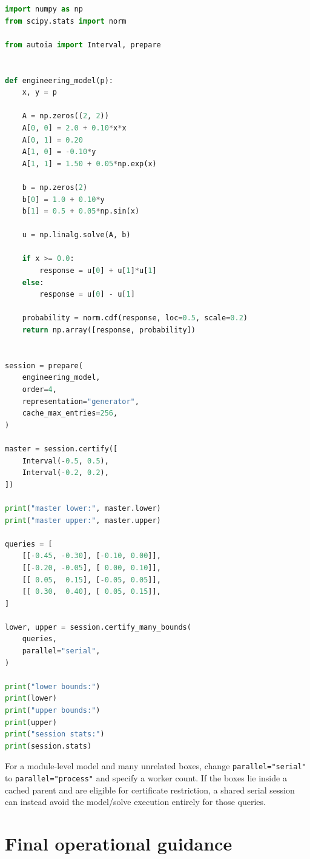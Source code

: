 \documentclass[11pt]{article}
\begin{document}
\begin{lstlisting}[language=Python]
import numpy as np
from scipy.stats import norm

from autoia import Interval, prepare


def engineering_model(p):
    x, y = p

    A = np.zeros((2, 2))
    A[0, 0] = 2.0 + 0.10*x*x
    A[0, 1] = 0.20
    A[1, 0] = -0.10*y
    A[1, 1] = 1.50 + 0.05*np.exp(x)

    b = np.zeros(2)
    b[0] = 1.0 + 0.10*y
    b[1] = 0.5 + 0.05*np.sin(x)

    u = np.linalg.solve(A, b)

    if x >= 0.0:
        response = u[0] + u[1]*u[1]
    else:
        response = u[0] - u[1]

    probability = norm.cdf(response, loc=0.5, scale=0.2)
    return np.array([response, probability])


session = prepare(
    engineering_model,
    order=4,
    representation="generator",
    cache_max_entries=256,
)

master = session.certify([
    Interval(-0.5, 0.5),
    Interval(-0.2, 0.2),
])

print("master lower:", master.lower)
print("master upper:", master.upper)

queries = [
    [[-0.45, -0.30], [-0.10, 0.00]],
    [[-0.20, -0.05], [ 0.00, 0.10]],
    [[ 0.05,  0.15], [-0.05, 0.05]],
    [[ 0.30,  0.40], [ 0.05, 0.15]],
]

lower, upper = session.certify_many_bounds(
    queries,
    parallel="serial",
)

print("lower bounds:")
print(lower)
print("upper bounds:")
print(upper)
print("session stats:")
print(session.stats)
\end{lstlisting}

For a module-level model and many unrelated boxes, change
\texttt{parallel="serial"} to \texttt{parallel="process"} and specify a worker
count.  If the boxes lie inside a cached parent and are eligible for certificate
restriction, a shared serial session can instead avoid the model/solve execution
entirely for those queries.

\section{Final operational guidance}
\end{document}
